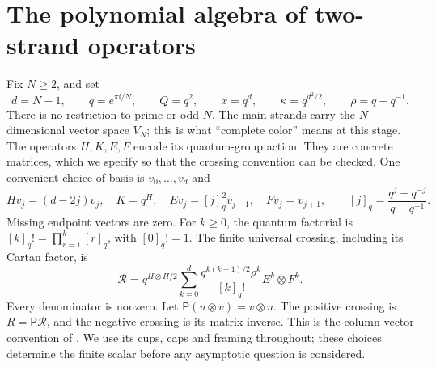 \section{The polynomial algebra of two-strand operators}\label{nt:algebra}
Fix $N\ge2$, and set
\begin{equation}\label{eq:root-notation}
 d=N-1,\qquad q=e^{\pi\ii/N},\qquad Q=q^2,\qquad
 x=q^d,\qquad \kappa=q^{d^2/2},\qquad \rho=q-q^{-1}.
\end{equation}
There is no restriction to prime or odd $N$. The main strands carry the $N$-dimensional vector space $V_N$; this is what ``complete color'' means at this stage. The operators $H,K,E,F$ encode its quantum-group action. They are concrete matrices, which we specify so that the crossing convention can be checked. One convenient choice of basis is $v_0,\ldots,v_d$ and
\[
 H v_j=(d-2j)v_j,\quad K=q^H,\quad
 E v_j=[j]_q^2v_{j-1},\quad Fv_j=v_{j+1},
 \qquad [j]_q=\frac{q^j-q^{-j}}{q-q^{-1}}.
\]
Missing endpoint vectors are zero. For $k\ge0$, the quantum factorial is
$[k]_q!=\prod_{r=1}^k[r]_q$, with $[0]_q!=1$.
The finite universal crossing, including its Cartan factor, is
\begin{equation}\label{eq:universal-crossing}
 \mathscr R=q^{H\otimes H/2}
 \sum_{k=0}^{d}\frac{q^{k(k-1)/2}\rho^k}{[k]_q!}
 E^k\otimes F^k.
\end{equation}
Every denominator is nonzero. Let $\mathsf P(u\otimes v)=v\otimes u$.
The positive crossing is $R=\mathsf P\mathscr R$, and the negative
crossing is its matrix inverse. This is the column-vector convention
of \cite[Proposition~5.1]{Finite}. We use its cups, caps and framing
throughout; these choices determine the finite scalar before any
asymptotic question is considered.

